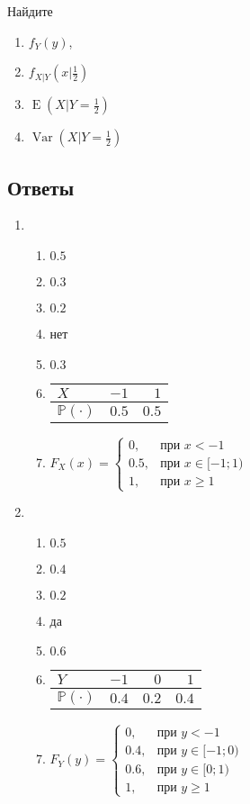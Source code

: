 \documentclass[12pt]{article}
\DeclareMathOperator{\Var}{Var}
\DeclareMathOperator{\E}{E}
\def \P{\mathbb{P}}
\begin{document}
\begin{enumerate}
Найдите
\begin{enumerate}
\item $f_{Y}(y)$,
\item $f_{X|Y}\left(x|\frac{1}{2}\right)$
\item $\E\left(X|Y = \frac{1}{2}\right)$
\item $\Var\left(X|Y = \frac{1}{2}\right)$
\end{enumerate}

\end{enumerate}

\subsection*{Ответы}

\begin{enumerate}

\item
\begin{enumerate}
\item   $0.5 $
\item   $0.3$
\item   $0.2$
\item   нет
\item   $0.3$
\item
\begin{tabular}{lrr}
\toprule
$X$ & $-1$  & $1$   \\ \midrule
$\P(\cdot)$ & $0.5$ & $0.5$ \\ \bottomrule
\end{tabular}
\item  $F_{X}(x) = \begin{cases}
0, & \text{при } x < -1 \\
0.5 , & \text{при } x \in [-1;1) \\
1, & \text{при }  x \geq 1
\end{cases}$
\end{enumerate}
\item
\begin{enumerate}
\item   $0.5$
\item   $0.4$
\item   $0.2$
\item   да
\item   $0.6$
\item
\begin{tabular}{lrrr}
\toprule
$Y$ & $-1$  & $0$   & $1$   \\ \midrule
$\P(\cdot)$ & $0.4$ & $0.2$ & $0.4$ \\ \bottomrule
\end{tabular}
\item   $F_{Y}(y) = \begin{cases}
0, & \text{при } y < -1 \\
0.4 , & \text{при } y \in [-1;0) \\
0.6, & \text{при }  y \in [0;1)\\
1, & \text{при } y \geq 1
\end{cases}$
\end{enumerate}


\end{enumerate}
\end{document}
